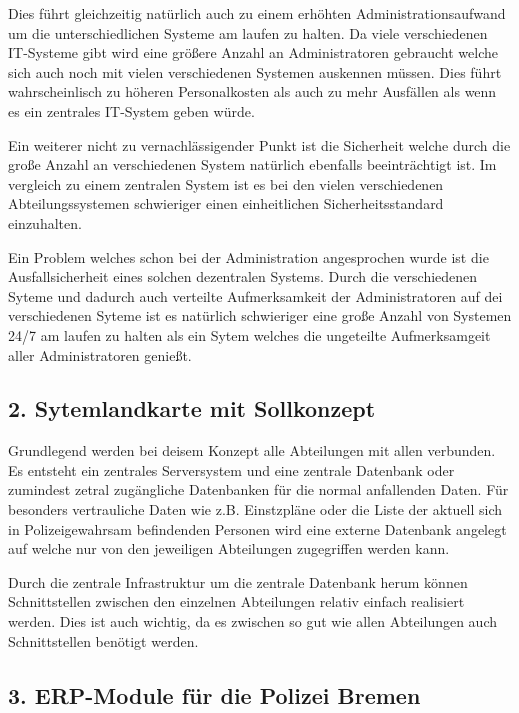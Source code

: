\documentclass[12pt,utf8]{scrartcl}
\begin{document}
Dies führt gleichzeitig natürlich auch zu einem erhöhten Administrationsaufwand um die unterschiedlichen Systeme am laufen zu halten. Da viele verschiedenen IT-Systeme gibt wird eine größere Anzahl an Administratoren gebraucht welche sich auch noch  mit vielen verschiedenen Systemen auskennen müssen. Dies führt wahrscheinlisch zu höheren Personalkosten als auch zu mehr Ausfällen als wenn es ein zentrales IT-System geben würde.

Ein weiterer nicht zu vernachlässigender Punkt ist die Sicherheit welche durch die große Anzahl an verschiedenen System natürlich ebenfalls beeinträchtigt ist. Im vergleich zu einem zentralen System ist es bei den vielen verschiedenen Abteilungssystemen schwieriger einen einheitlichen Sicherheitsstandard einzuhalten.

Ein Problem welches schon bei der Administration angesprochen wurde ist die Ausfallsicherheit eines solchen dezentralen Systems. Durch die verschiedenen Syteme und dadurch auch verteilte Aufmerksamkeit der Administratoren auf dei verschiedenen Syteme ist es natürlich schwieriger eine große Anzahl von Systemen 24/7 am laufen zu halten als ein Sytem welches die ungeteilte Aufmerksamgeit aller Administratoren genießt.


\subsection*{\label{sub:thema}2. Sytemlandkarte mit Sollkonzept}

Grundlegend werden bei deisem Konzept alle Abteilungen mit allen verbunden. Es entsteht ein zentrales Serversystem und eine zentrale Datenbank oder zumindest zetral zugängliche Datenbanken für die normal anfallenden Daten. Für besonders vertrauliche Daten wie z.B. Einstzpläne oder die Liste der aktuell sich in Polizeigewahrsam befindenden Personen wird eine externe Datenbank angelegt auf welche nur von den jeweiligen Abteilungen zugegriffen werden kann.

Durch die zentrale Infrastruktur um die zentrale Datenbank herum können Schnittstellen zwischen den einzelnen Abteilungen relativ einfach realisiert werden. Dies ist auch wichtig, da es zwischen so gut wie allen Abteilungen auch Schnittstellen benötigt werden. 






\subsection*{\label{Aufgabe 2.1.3}3. ERP-Module für die Polizei Bremen}
\end{document}
